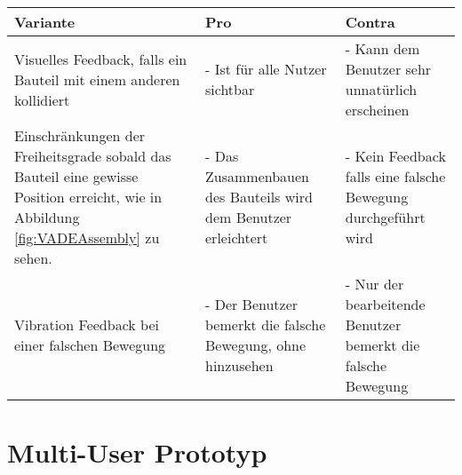 \begin{center}
	\begin{tabularx} {\textwidth} { |X|X|X| }
		\hline
		\rowcolor{black}
		\color{white} \textbf{Variante} & \color{white} \textbf{Pro} & 
		\color{white} \textbf{Contra} \\
		\hline
		Visuelles Feedback, falls ein Bauteil mit einem anderen kollidiert & - Ist für alle Nutzer sichtbar & - Kann dem Benutzer sehr unnatürlich erscheinen \\
		\hline
		Einschränkungen der Freiheitsgrade sobald das Bauteil eine gewisse Position erreicht, wie in Abbildung \ref{fig:VADEAssembly} zu sehen. & - Das Zusammenbauen des Bauteils wird dem Benutzer erleichtert & - Kein Feedback falls eine falsche Bewegung durchgeführt wird \\
		\hline
		Vibration Feedback bei einer falschen Bewegung & - Der Benutzer bemerkt die falsche Bewegung, ohne hinzusehen & - Nur der bearbeitende Benutzer bemerkt die falsche Bewegung \\
		\hline	
	\end{tabularx}
\end{center}
\label{tbl:varianten_zusammenbau}

\section{Multi-User Prototyp}